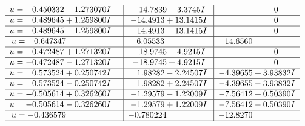 \documentclass[1p]{elsarticle_modified}
\theoremstyle{definition}
\begin{document}
$$\begin{array}{c|c|c}
\begin{aligned}
u &= \phantom{-}0.450332 - 1.273070 I\end{aligned}
 & -14.7839 + 3.3745 I & \phantom{-0.000000 } 0 \\ \hline\begin{aligned}
u &= \phantom{-}0.489645 + 1.259800 I\end{aligned}
 & -14.4913 + 13.1415 I & \phantom{-0.000000 } 0 \\ \hline\begin{aligned}
u &= \phantom{-}0.489645 - 1.259800 I\end{aligned}
 & -14.4913 - 13.1415 I & \phantom{-0.000000 } 0 \\ \hline\begin{aligned}
u &= \phantom{-}0.647347\phantom{ +0.000000I}\end{aligned}
 & -6.05533\phantom{ +0.000000I} & -14.6560\phantom{ +0.000000I} \\ \hline\begin{aligned}
u &= -0.472487 + 1.271320 I\end{aligned}
 & -18.9745 - 4.9215 I & \phantom{-0.000000 } 0 \\ \hline\begin{aligned}
u &= -0.472487 - 1.271320 I\end{aligned}
 & -18.9745 + 4.9215 I & \phantom{-0.000000 } 0 \\ \hline\begin{aligned}
u &= \phantom{-}0.573524 + 0.250742 I\end{aligned}
 & \phantom{-}1.98282 - 2.24507 I & -4.39655 + 3.93832 I \\ \hline\begin{aligned}
u &= \phantom{-}0.573524 - 0.250742 I\end{aligned}
 & \phantom{-}1.98282 + 2.24507 I & -4.39655 - 3.93832 I \\ \hline\begin{aligned}
u &= -0.505614 + 0.326260 I\end{aligned}
 & -1.29579 - 1.22009 I & -7.56412 + 0.50390 I \\ \hline\begin{aligned}
u &= -0.505614 - 0.326260 I\end{aligned}
 & -1.29579 + 1.22009 I & -7.56412 - 0.50390 I \\ \hline\begin{aligned}
u &= -0.436579\phantom{ +0.000000I}\end{aligned}
 & -0.780224\phantom{ +0.000000I} & -12.8270\phantom{ +0.000000I}\\
 \hline 
 \end{array}$$\newpage
\end{document}

